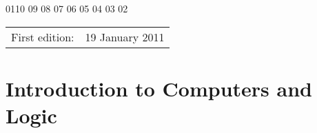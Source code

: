 \documentclass[letterpaper,10pt,extrafontsizesmtwoside,onecolumn,openright,draft,fleqn]{memoir}
\begin{document}

\begin{center}
01\hspace{2em}10 09 08 07 06 05 04 03 02
\end{center}
\begin{center}
\begin{tabular}{ll}
First edition:                        & 19 January 2011 \\
\end{tabular}
\end{center}

\endgroup

\cleardoublepage

\pagestyle{headings}

\setupshorttoc
\tableofcontents
\clearpage
\setupparasubsecs
\setupmaintoc
\tableofcontents
\clearpage
\listoffigures
\clearpage
\listofasides
\clearpage

\mainmatter

\raggedbottom

\part{Introduction to Computers and Logic}
\end{document}
